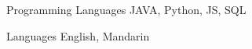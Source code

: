 

\begin{cvskills}

  \cvskill
    {Programming Languages} %
    {JAVA, Python, JS, SQL} %
    
    
    

  \cvskill
    {Languages} %
    {English, Mandarin} %

\end{cvskills}
